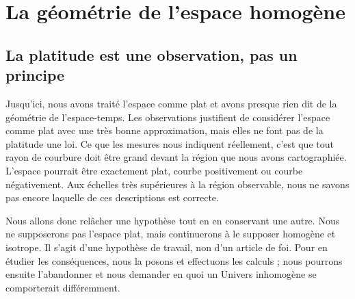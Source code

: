 \chapter{La géométrie de l’espace homogène}


\section{La platitude est une observation, pas un principe}

Jusqu’ici, nous avons traité l’espace comme plat et avons presque rien dit de la géométrie de l’espace-temps. Les observations justifient de considérer l’espace comme plat avec une très bonne approximation, mais elles ne font pas de la platitude une loi. Ce que les mesures nous indiquent réellement, c’est que tout rayon de courbure doit être grand devant la région que nous avons cartographiée. L’espace pourrait être exactement plat, courbe positivement ou courbe négativement. Aux échelles très supérieures à la région observable, nous ne savons pas encore laquelle de ces descriptions est correcte.

Nous allons donc relâcher une hypothèse tout en en conservant une autre. Nous ne supposerons pas l’espace plat, mais continuerons à le supposer homogène et isotrope. Il s’agit d’une hypothèse de travail, non d’un article de foi. Pour en étudier les conséquences, nous la posons et effectuons les calculs ; nous pourrons ensuite l’abandonner et nous demander en quoi un Univers inhomogène se comporterait différemment.

